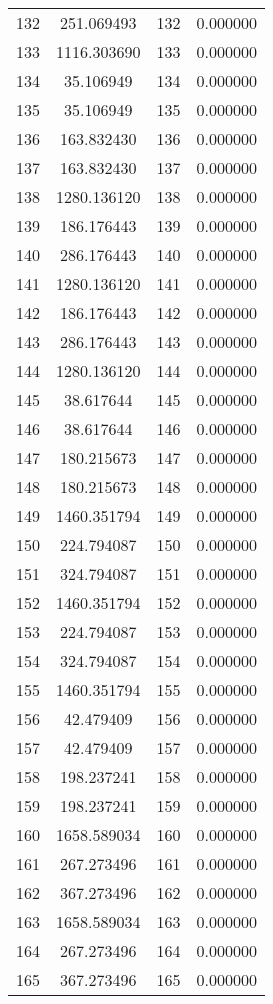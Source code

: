 \documentclass[12pt]{article}
\begin{document}
\begin{longtable}{@{}cccc@{}}
132 & 251.069493 & 132 & 0.000000 \\
133 & 1116.303690 & 133 & 0.000000 \\
134 & 35.106949 & 134 & 0.000000 \\
135 & 35.106949 & 135 & 0.000000 \\
136 & 163.832430 & 136 & 0.000000 \\
137 & 163.832430 & 137 & 0.000000 \\
138 & 1280.136120 & 138 & 0.000000 \\
139 & 186.176443 & 139 & 0.000000 \\
140 & 286.176443 & 140 & 0.000000 \\
141 & 1280.136120 & 141 & 0.000000 \\
142 & 186.176443 & 142 & 0.000000 \\
143 & 286.176443 & 143 & 0.000000 \\
144 & 1280.136120 & 144 & 0.000000 \\
145 & 38.617644 & 145 & 0.000000 \\
146 & 38.617644 & 146 & 0.000000 \\
147 & 180.215673 & 147 & 0.000000 \\
148 & 180.215673 & 148 & 0.000000 \\
149 & 1460.351794 & 149 & 0.000000 \\
150 & 224.794087 & 150 & 0.000000 \\
151 & 324.794087 & 151 & 0.000000 \\
152 & 1460.351794 & 152 & 0.000000 \\
153 & 224.794087 & 153 & 0.000000 \\
154 & 324.794087 & 154 & 0.000000 \\
155 & 1460.351794 & 155 & 0.000000 \\
156 & 42.479409 & 156 & 0.000000 \\
157 & 42.479409 & 157 & 0.000000 \\
158 & 198.237241 & 158 & 0.000000 \\
159 & 198.237241 & 159 & 0.000000 \\
160 & 1658.589034 & 160 & 0.000000 \\
161 & 267.273496 & 161 & 0.000000 \\
162 & 367.273496 & 162 & 0.000000 \\
163 & 1658.589034 & 163 & 0.000000 \\
164 & 267.273496 & 164 & 0.000000 \\
165 & 367.273496 & 165 & 0.000000 \\

\end{longtable}
\end{document}
